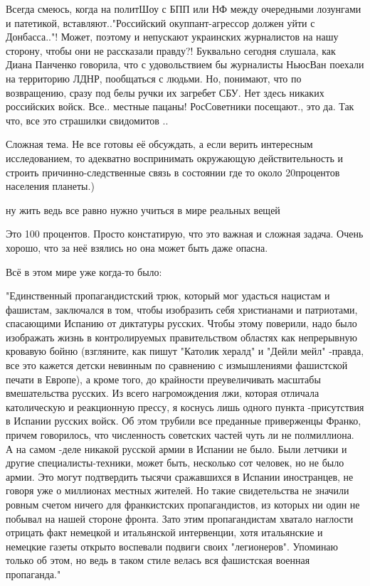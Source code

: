 \begin{itemize}
\begin{itemize}
Всегда смеюсь, когда на политШоу с БПП или НФ между очередными лозунгами и
патетикой, вставляют.."Российский окуппант-агрессор должен уйти с Донбасса.."!
Может, поэтому и непускают украинских журналистов на нашу сторону, чтобы они не
рассказали правду?! Буквально сегодня слушала, как Диана Панченко говорила, что
с удовольствием бы журналисты НьюсВан поехали на территорию ЛДНР, пообщаться с
людьми. Но, понимают, что по возвращению, сразу под белы ручки их загребет СБУ.
Нет здесь никаких российских войск. Все.. местные пацаны! РосСоветники
посещают., это да. Так что, все это страшилки свидомитов ..

\end{itemize} %


Сложная тема. Не все готовы её обсуждать, а если верить интересным
исследованием, то адекватно воспринимать окружающую действительность и строить
причинно-следственные связь в состоянии где то около 20процентов населения
планеты.)

\begin{itemize} %
ну жить ведь все равно нужно учиться в мире реальных вещей

Это 100 процентов.
Просто констатирую, что это важная и сложная задача. Очень хорошо, что за неё взялись но она может быть даже опасна.
\end{itemize} %


Всё в этом мире уже когда-то было:

"Единственный пропагандистский трюк, который мог удасться нацистам и фашистам,
заключался в том, чтобы изобразить себя христианами и патриотами, спасающими
Испанию от диктатуры русских. Чтобы этому поверили, надо было изображать жизнь
в контролируемых правительством областях как непрерывную кровавую бойню
(взгляните, как пишут "Католик хералд" и "Дейли мейл" -правда, все это кажется
детски невинным по сравнению с измышлениями фашистской печати в Европе), а
кроме того, до крайности преувеличивать масштабы вмешательства русских. Из
всего нагромождения лжи, которая отличала католическую и реакционную прессу, я
коснусь лишь одного пункта -присутствия в Испании русских войск. Об этом
трубили все преданные приверженцы Франко, причем говорилось, что численность
советских частей чуть ли не полмиллиона. А на самом -деле никакой русской армии
в Испании не было. Были летчики и другие специалисты-техники, может быть,
несколько сот человек, но не было армии. Это могут подтвердить тысячи
сражавшихся в Испании иностранцев, не говоря уже о миллионах местных жителей.
Но такие свидетельства не значили ровным счетом ничего для франкистских
пропагандистов, из которых ни один не побывал на нашей стороне фронта. Зато
этим пропагандистам хватало наглости отрицать факт немецкой и итальянской
интервенции, хотя итальянские и немецкие газеты открыто воспевали подвиги своих
"легионеров". Упоминаю только об этом, но ведь в таком стиле велась вся
фашистская военная пропаганда."


\end{itemize}
